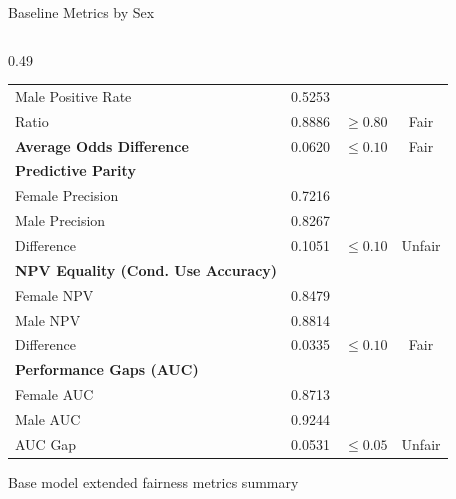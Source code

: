 \documentclass[10pt,aspectratio=169]{beamer}
\begin{document}
\begin{frame}[t]{Baseline Metrics by Sex}
\begin{columns}[T,onlytextwidth]
\begin{column}{0.49\textwidth}
{\begin{tabular}{|l|c|c|c|}
        \quad Male Positive Rate & 0.5253 &  &  \\
        \quad Ratio & 0.8886 & $\geq 0.80$ & Fair  \\
        \hline
        \textbf{Average Odds Difference} & 0.0620 & $\leq 0.10$ & Fair  \\
        \hline
        \textbf{Predictive Parity} &  &  &  \\
        \quad Female Precision & 0.7216 &  &  \\
        \quad Male Precision & 0.8267 &  &  \\
        \quad Difference & 0.1051 & $\leq 0.10$ & Unfair \\
        \hline
        \textbf{NPV Equality (Cond. Use Accuracy)} &  &  &  \\
        \quad Female NPV & 0.8479 &  &  \\
        \quad Male NPV & 0.8814 &  &  \\
        \quad Difference & 0.0335 & $\leq 0.10$ & Fair \\
        \hline
        \textbf{Performance Gaps (AUC)} &  &  &  \\
        \quad Female AUC & 0.8713 &  &  \\
        \quad Male AUC & 0.9244 &  &  \\
        \quad AUC Gap & 0.0531 & $\leq 0.05$ & Unfair  \\
        \hline
        \end{tabular}%
      }
      \vspace{0.4em}
      {\footnotesize Base model extended fairness metrics summary}
    \end{column}
  \end{columns}
\end{frame}
\end{document}
